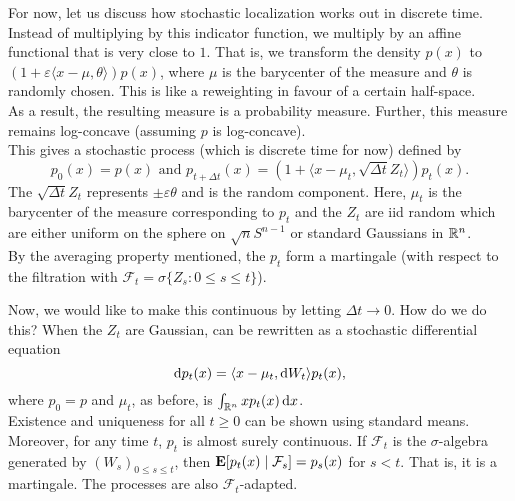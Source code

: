 \documentclass{article}
\begin{document}
		For now, let us discuss how stochastic localization works out in discrete time. Instead of multiplying by this indicator function, we multiply by an affine functional that is very close to $1$. That is, we transform the density $p(x)$ to $(1 + \varepsilon\langle x-\mu,\theta\rangle)p(x)$, where $\mu$ is the barycenter of the measure and $\theta$ is randomly chosen. This is like a reweighting in favour of a certain half-space.\\
		As a result, the resulting measure is a probability measure. Further, this measure remains log-concave (assuming $p$ is log-concave).\\
		This gives a stochastic process (which is discrete time for now) defined by
		\begin{equation}
			\label{eqn: discrete time stochastic localization}
			p_0(x) = p(x) \text{ and } p_{t+\Delta t}(x) = (1 + \langle x-\mu_t,\sqrt{\Delta t}Z_t\rangle) p_t(x).
		\end{equation}
		The $\sqrt{\Delta t}Z_t$ represents $\pm \varepsilon\theta$ and is the random component. Here, $\mu_t$ is the barycenter of the measure corresponding to $p_t$ and the $Z_t$ are iid random which are either uniform on the sphere on $\sqrt{n}S^{n-1}$ or standard Gaussians in $\mathbb{R}^n$.\\
		By the averaging property mentioned, the $p_t$ form a martingale (with respect to the filtration with $\mathcal{F}_t = \sigma\{Z_s : 0\leq s\leq t\}$).

		Now, we would like to make this continuous by letting $\Delta t\to 0$. How do we do this? When the $Z_t$ are Gaussian,  can be rewritten as a stochastic differential equation
		\begin{equation}
			\label{eqn: continuous time stochastic localization density}
			\d{p}_t(x) = \langle x-\mu_t,\d{W}_t\rangle p_t(x),%
		\end{equation}
		where $p_0=p$ and $\mu_t$, as before, is $\int_{\mathbb{R}^n} x p_t(x) \operatorname{d}\!{x}$.\\
		Existence and uniqueness for all $t\geq 0$ can be shown using standard means. Moreover, for any time $t$, $p_t$ is almost surely continuous. If $\mathcal{F}_t$ is the $\sigma$-algebra generated by $(W_s)_{0\leq s\leq t}$, then $\textbf{E}[p_t(x) \mid \mathcal{F}_s] = p_s(x)$ for $s<t$. That is, it is a martingale. The processes are also $\mathcal{F}_t$-adapted.\\
\end{document}
